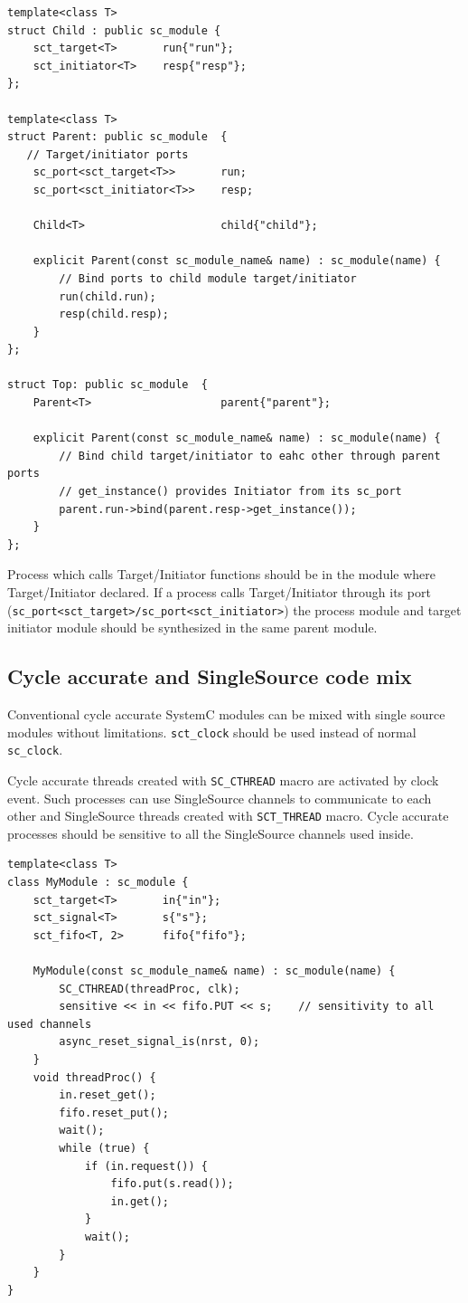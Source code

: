 \begin{lstlisting}[style=mycpp]
template<class T>
struct Child : public sc_module {
    sct_target<T>       run{"run"};
    sct_initiator<T>    resp{"resp"};
};

template<class T>
struct Parent: public sc_module  {
   // Target/initiator ports
    sc_port<sct_target<T>>       run;   
    sc_port<sct_initiator<T>>    resp;   

    Child<T>                     child{"child"};
  
    explicit Parent(const sc_module_name& name) : sc_module(name) {
        // Bind ports to child module target/initiator
        run(child.run);      
        resp(child.resp);
    }
};

struct Top: public sc_module  {
    Parent<T>                    parent{"parent"};
  
    explicit Parent(const sc_module_name& name) : sc_module(name) {
        // Bind child target/initiator to eahc other through parent ports
        // get_instance() provides Initiator from its sc_port   
        parent.run->bind(parent.resp->get_instance());   
    }
};
\end{lstlisting}
Process which calls Target/Initiator functions should be in the module where Target/Initiator declared. If a process calls Target/Initiator through its port ({\tt sc\_port<sct\_target>/sc\_port<sct\_initiator>}) the process module and target initiator module should be synthesized in the same parent module.

\subsection{Cycle accurate and SingleSource code mix}

Conventional cycle accurate SystemC modules can be mixed with single source modules without limitations. {\tt sct\_clock} should be used instead of normal {\tt sc\_clock}.

Cycle accurate threads created with {\tt SC\_CTHREAD} macro are activated by clock event. Such processes can use SingleSource channels to communicate to each other and SingleSource threads created with {\tt SCT\_THREAD} macro. Cycle accurate processes should be sensitive to all the SingleSource channels used inside.

\begin{lstlisting}[style=mycpp]
template<class T>
class MyModule : sc_module {
    sct_target<T>       in{"in"};
    sct_signal<T>       s{"s"};
    sct_fifo<T, 2>      fifo{"fifo"};

    MyModule(const sc_module_name& name) : sc_module(name) {
        SC_CTHREAD(threadProc, clk);
        sensitive << in << fifo.PUT << s;    // sensitivity to all used channels
        async_reset_signal_is(nrst, 0);
    }
    void threadProc() {
        in.reset_get();
        fifo.reset_put();
        wait();
        while (true) {
            if (in.request()) {
                fifo.put(s.read()); 
                in.get();
            }
            wait();
        }
    }
}
\end{lstlisting}

